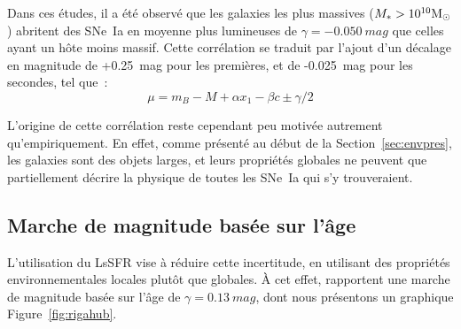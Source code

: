 \documentclass[../main/main.tex]{subfiles}
\begin{document}
Dans ces études, il a été observé que les galaxies les plus
massives ($M_* > 10^{10}\si{\Msun}$) abritent des SNe~Ia en moyenne plus
lumineuses de $\gamma = -\SI{0.050}{mag}$ que celles ayant un hôte moins massif.
Cette corrélation se traduit par l'ajout d'un décalage en magnitude de
+\SI{0.25}{mag} pour les premières, et de -\SI{0.025}{mag} pour les secondes,
tel que~:
\begin{equation}\label{eq:mbmass}
    \mu = m_B - M + \alpha x_1 - \beta c \pm \gamma/2
\end{equation}

L'origine de cette corrélation reste cependant peu motivée autrement
qu'empiriquement. En effet, comme présenté au début de la
Section~\ref{sec:envpres}, les galaxies sont des objets larges, et leurs
propriétés globales ne peuvent que partiellement décrire la physique de toutes
les SNe~Ia qui s'y trouveraient. 

\subsection{Marche de magnitude basée sur l'âge}\label{ssec:astep}

L'utilisation du LsSFR vise à réduire cette incertitude, en utilisant des
propriétés environnementales locales plutôt que globales. À cet effet,
\cite{rigault2020} rapportent une marche de magnitude basée sur l'âge de $\gamma
= \SI{0.13}{mag}$, dont nous présentons un graphique Figure~\ref{fig:rigahub}.

\end{document}
